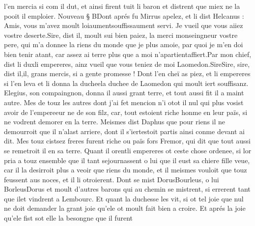 \documentclass{article}
\begin{document}
\begin{pages}
               l’en mercia si com il dut, et ainsi firent tuit li baron et distrent que 
               miex ne la pooit il emploier. 
               Nouveau § BDont aprés fu Mirrus 
               apelez, et li dist Helcanus :
               Amis, vous m’avez moult 
                  loiaumentsouffissaument servi. 
                  Je vueil que vous aiiez vostre deserte.Sire, dist il, moult sui bien paiez, 
                  la merci monseingneur vostre pere, 
                  qui m’a donnee la riens du monde que je plus amoie, 
                  par quoi je m’en doi bien tenir atant, car assez ai terre plus que a moi 
                  n’apartientaffiert.Par mon chief, dist 
                  li duxli empereres, 
                  ainz vueil que vous teniez de moi Laomedon.SireSire, sire,
                  dist il,il, grans mercis, si a gente promesse !
               Dont l’en cheï as piez, et li empereres si l’en leva et 
               li donna 
               la ducheela duchee de Laomedon
               qui moult iert souffisanz. 
               Elegius, son compaingnon, donna 
               il aussi grant terre, 
               et tout aussi fit il a maint autre. Mes de touz les autres dont j’ai fet mencion n’i 
               otot il nul qui plus vosist avoir 
               de l’empereeur ne de son filz, 
               car, tout estoient riche honme en leur païs, si ne vodrent demorer en la terre. 
               Meismes dist Daphus que 
               pour riens il ne demourroit que il n’alast arriere, 
               dont il s’iertestoit partis 
               ainsi conme devant ai dit. 
               Mes touz cistsez freres furent riche ou païs fors 
               Fremor, 
               qui dit que tout aussi se remetroit il en sa terre. \pend
            \pstart Quant il orentli empereres ot 
               ceste chose ordenee, si lor pria a touz ensemble que 
               il 
                  tant sejournassent o lui que il eust sa chiere fille 
                  veue, 
               car il la desirroit plus a veoir que riens du monde, et il meismes vouloit que touz feussent aus noces, 
               et il li otroierent. Dont se mist 
               DorusBourleus, o lui 
               BorleusDorus
               et moult d’autres barons qui au chemin 
               se mistrent, 
               si errerent tant que ilet vindrent a 
               Lembourc. 
               Et quant la duchesse les vit, si ot tel joie que
               nul ne doit demander la grant joie qu’ele ot
                  moult fait bien a croire. 
               Et aprés la joie qu’ele fist sot elle la besongne que il furent 

\end{pages}
\end{document}
